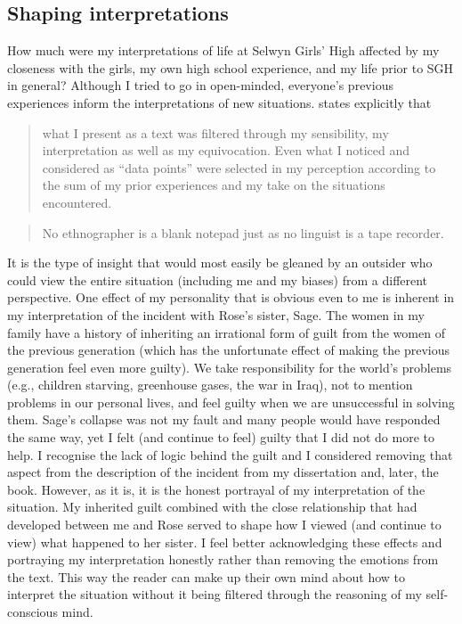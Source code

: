 \subsection{Shaping interpretations}

How much were my interpretations of life at Selwyn Girls' High affected by my closeness with the girls, my own high school experience, and my life prior to SGH in general?  Although I tried to go in open-minded, everyone's previous experiences inform the interpretations of new situations.  states explicitly that

\begin{quote}
	what I present as a text was filtered through my sensibility, my interpretation as well as my equivocation.  Even what I noticed and considered as ``data points'' were selected in my perception according to the sum of my prior experiences and my take on the situations encountered. \cite[44]{mendozadenton2008}
\end{quote}

\begin{quote}
	No ethnographer is a blank note\-pad just as no linguist is a tape re\-corder. \cite[48]{mendozadenton2008}
\end{quote}
 
\noindent It is the type of insight that would most easily be gleaned by an outsider who could view the entire situation (including me and my biases) from a different perspective.  One effect of my personality that is obvious even to me is inherent in my interpretation of the incident with Rose's sister, Sage.  The women in my family have a history of inheriting an irrational form of guilt from the women of the previous generation (which has the unfortunate effect of making the previous generation feel even more guilty).  We take responsibility for the world's problems (e.g., children starving, greenhouse gases, the war in Iraq), not to mention problems in our personal lives, and feel guilty when we are unsuccessful in solving them.  Sage's collapse was not my fault and many people would have responded the same way, yet I felt (and continue to feel) guilty that I did not do more to help.  I recognise the lack of logic behind the guilt and I considered removing that aspect from the description of the incident from my dissertation and, later, the book.  However, as it is, it is the honest portrayal of my interpretation of the situation.  My inherited guilt combined with the close relationship that had developed between me and Rose served to shape how I viewed (and continue to view) what happened to her sister.  I feel better acknowledging these effects and portraying my interpretation honestly rather than removing the emotions from the text.  This way the reader can make up their own mind about how to interpret the situation without it being filtered through the reasoning of my self-conscious mind.

